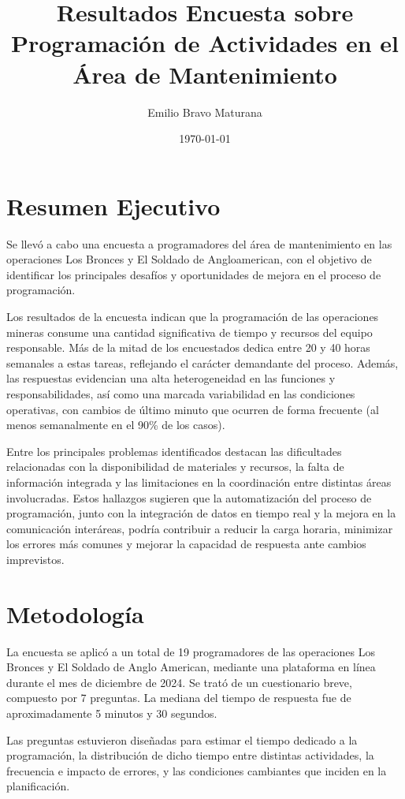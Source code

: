 \documentclass{article}
\title{Resultados Encuesta sobre Programación de Actividades en el Área de Mantenimiento}
\author{Emilio Bravo Maturana}
\date{\today}
\begin{document}
\maketitle

\section*{Resumen Ejecutivo}

Se llevó a cabo una encuesta a programadores del área de mantenimiento en las operaciones Los Bronces y El Soldado de Angloamerican, con el objetivo de identificar los principales desafíos y oportunidades de mejora en el proceso de programación.

Los resultados de la encuesta indican que la programación de las operaciones mineras consume una cantidad significativa de tiempo y recursos del equipo responsable. Más de la mitad de los encuestados dedica entre 20 y 40 horas semanales a estas tareas, reflejando el carácter demandante del proceso. Además, las respuestas evidencian una alta heterogeneidad en las funciones y responsabilidades, así como una marcada variabilidad en las condiciones operativas, con cambios de último minuto que ocurren de forma frecuente (al menos semanalmente en el 90\% de los casos).

Entre los principales problemas identificados destacan las dificultades relacionadas con la disponibilidad de materiales y recursos, la falta de información integrada y las limitaciones en la coordinación entre distintas áreas involucradas. Estos hallazgos sugieren que la automatización del proceso de programación, junto con la integración de datos en tiempo real y la mejora en la comunicación interáreas, podría contribuir a reducir la carga horaria, minimizar los errores más comunes y mejorar la capacidad de respuesta ante cambios imprevistos.


\section*{Metodología}

La encuesta se aplicó a un total de 19 programadores de las operaciones Los Bronces y El Soldado de Anglo American, mediante una plataforma en línea durante el mes de diciembre de 2024. Se trató de un cuestionario breve, compuesto por 7 preguntas. La mediana del tiempo de respuesta fue de aproximadamente 5 minutos y 30 segundos. 

Las preguntas estuvieron diseñadas para estimar el tiempo dedicado a la programación, la distribución de dicho tiempo entre distintas actividades, la frecuencia e impacto de errores, y las condiciones cambiantes que inciden en la planificación.
\end{document}

